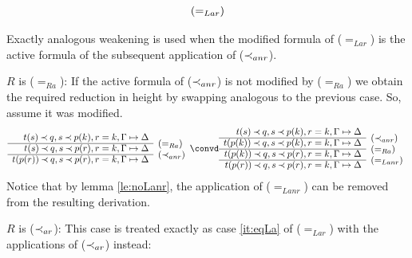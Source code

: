 \begin{PROOF}
\begin{LS}
\[\begin{array}{rl}
\raisebox{1.2ex}[1.5ex][0ex]{$(=_{Lar})$}
\end{array} \]
Exactly analogous weakening is used when the modified formula of ($=_{Lar}$)
is the active formula of the subsequent application of ($\mathbin{\prec}_{anr}$).
%
\item $R$ is ($=_{Ra}$):
If the active formula of ($\mathbin{\prec}_{anr}$) is not modified by ($=_{Ra}$) we
obtain the required reduction in height by swapping analogous to the previous
case. So, assume it was modified.
\[ \begin{array}{rl}
t(s) \Incl q, s\Incl p(k), r=k, \Gamma\Seq\Delta \\ \cline{1-1}
t(s)\Incl q, s\Incl p(r), r=k, \Gamma\Seq\Delta &
\raisebox{1.2ex}[1.5ex][0ex]{$(=_{Ra})$} \\ \cline{1-1}
t(p(r))\Incl q, s\Incl p(r), r=k, \Gamma\Seq\Delta &
\raisebox{1.2ex}[1.5ex][0ex]{$(\Incl_{anr})$} 
\end{array} \convd
 \begin{array}{rl}
t(s) \Incl q, s\Incl p(k), r=k, \Gamma\Seq\Delta \\ \cline{1-1}
t(p(k))\Incl q, s\Incl p(k), r=k, \Gamma\Seq\Delta &
\raisebox{1.2ex}[1.5ex][0ex]{$(\Incl_{anr})$} \\ \cline{1-1}
t(p(k))\Incl q, s\Incl p(r), r=k, \Gamma\Seq\Delta &
\raisebox{1.2ex}[1.5ex][0ex]{$(=_{Ra})$} \\ \cline{1-1}
t(p(r))\Incl q, s\Incl p(r), r=k, \Gamma\Seq\Delta & \rabove{(=_{Lanr})}
\end{array} \]
Notice that by lemma \ref{le:noLanr}, the application of ($=_{Lanr}$) can be
removed from the resulting derivation.
\item $R$ is ($\mathbin{\prec}_{ar}$): This case is treated exactly as case \ref{it:eqLa} of
($=_{Lar}$) with the applications of ($\mathbin{\prec}_{ar}$) instead:

\end{LS}
\end{PROOF}
